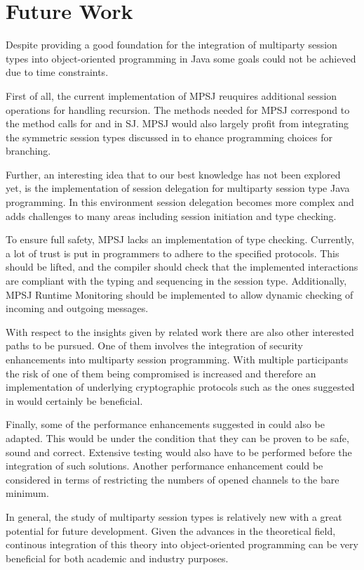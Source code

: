 \cleardoublepage
\chapter{Future Work}
\label{ch:futurework}

Despite providing a good foundation for the integration of multiparty session types into object-oriented programming in Java some goals could not be achieved due to time constraints.

First of all, the current implementation of MPSJ reuquires additional session operations for handling recursion. The methods needed for MPSJ correspond to the method calls for  and  in SJ. MPSJ would also largely profit from integrating the symmetric session types discussed in \cite{symmetric_sum} to ehance programming choices for branching.

Further, an interesting idea that to our best knowledge has not been explored yet, is the implementation of session delegation for multiparty session type Java programming. In this environment session delegation becomes more complex and adds challenges to many areas including session initiation and type checking.

To ensure full safety, MPSJ lacks an implementation of type checking. Currently, a lot of trust is put in programmers to adhere to the specified protocols. This should be lifted, and the compiler should check that the implemented interactions are compliant with the typing and sequencing in the session type. Additionally, MPSJ Runtime Monitoring should be implemented to allow dynamic checking of incoming and outgoing messages.

With respect to the insights given by related work there are also other interested paths to be pursued. One of them involves the integration of security enhancements into multiparty session programming. With multiple participants the risk of one of them being compromised is increased and therefore an implementation of underlying cryptographic protocols such as the ones suggested in \cite{crypto_mpst1, crypto_mpst2} would certainly be beneficial.

Finally, some of the performance enhancements suggested in \cite{sess_type_guided_distr_interact} could also be adapted. This would be under the condition that they can be proven to be safe, sound and correct. Extensive testing would also have to be performed before the integration of such solutions. Another performance enhancement could be considered in terms of restricting the numbers of opened channels to the bare minimum. 

In general, the study of multiparty session types is relatively new with a great potential for future development. Given the advances in the theoretical field, continous integration of this theory into object-oriented programming can be very beneficial for both academic and industry purposes.

